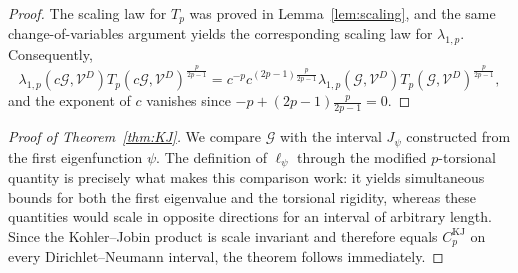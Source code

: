 \documentclass[12pt,a4paper]{article}
\numberwithin{equation}{section}
\begin{document}
	\begin{proof}
	The scaling law for $T_p$ was proved in
	Lemma~\ref{lem:scaling}, and the same change-of-variables argument yields
	the corresponding scaling law for $\lambda_{1,p}$. Consequently,
		\[
		\lambda_{1,p}(c\mathcal G,\mathcal V^D)
		T_p(c\mathcal G,\mathcal V^D)^{\frac{p}{2p-1}}
		=
		c^{-p}
		c^{(2p-1)\frac{p}{2p-1}}
		\lambda_{1,p}(\mathcal G,\mathcal V^D)
		T_p(\mathcal G,\mathcal V^D)^{\frac{p}{2p-1}},
		\]
		and the exponent of $c$ vanishes since
		\(
		-p+(2p-1)\frac{p}{2p-1}=0.
		\)
	\end{proof}
	\begin{proof}[Proof of Theorem~\ref{thm:KJ}]
	We compare $\mathcal G$ with the interval $J_\psi$ constructed from the
	first eigenfunction $\psi$. The definition of $\ell_\psi$ through the
	modified $p$-torsional quantity is precisely what makes this comparison work:
	it yields simultaneous bounds for both the first eigenvalue and the
	torsional rigidity, whereas these quantities would scale in opposite
	directions for an interval of arbitrary length. Since the
	Kohler--Jobin product is scale invariant and therefore equals
	$C_p^{\mathrm{KJ}}$ on every Dirichlet--Neumann interval, the theorem
	follows immediately.
		

\end{proof}
\end{document}
